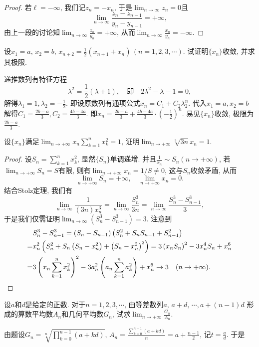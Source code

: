 \begin{quiza}
\begin{proof}
若\(\ell=-\infty\), 我们记\(z_n=-x_n\), 于是\(\lim_{n\rightarrow\infty}z_n=0\)且\[\lim_{n\rightarrow\infty}\frac{z_n-z_{n-1}}{y_n-y_{n-1}}=+\infty,\]由上一段的讨论知\(\lim_{n\rightarrow\infty}\frac{z_n}{y_n}=+\infty\), 从而\(\lim_{n\rightarrow\infty}\frac{x_n}{y_n}=-\infty.\)
\end{proof}
\woe 设\(x_1=a,\,x_2=b,\,x_{n+2}=\frac{1}{2}(x_{n+1}+x_n)\,(n=1,2,3,\cdots)\). 试证明\(\{x_n\}\)收敛, 并求其极限.
\begin{solution}
递推数列有特征方程\[\lambda^2=\frac{1}{2}(\lambda+1),\quad\text{即}\quad 2\lambda^2-\lambda-1=0,\]解得\(\lambda_1=1,\lambda_2=-\frac{1}{2}\). 即设原数列有通项公式\(x_n=C_1+C_2\lambda_2^n\). 代入\(x_1=a,x_2=b\)解得\(C_1=\frac{2b-a}{3},C_2=\frac{4b-4a}{3}.\) 即\(x_n=\frac{2b-a}{3}+\frac{4b-4a}{3}\cdot\left(-\frac{1}{2}\right)^n.\) 易见\(\{x_n\}\)收敛, 极限为\(\frac{2b-a}{3}\).
\end{solution}
\woe 设\(\{x_n\}\)满足\(\lim_{n\rightarrow+\infty}x_{n}\sum_{k=1}^{n}x_k^2=1\), 证明\(\lim_{n\rightarrow+\infty}\sqrt[3]{3n}x_{n}=1\).
\begin{proof}
设\(S_n=\sum_{k=1}^{n}x_k^2\), 显然\(\{S_n\}\)单调递增. 并且\(\frac{1}{x_n}\sim S_n(n\rightarrow+\infty)\), 若\(\lim_{n\rightarrow+\infty}S_n=S\)有限, 则有\(\lim_{n\rightarrow+\infty}x_n=1/S\ne 0\), 这与\(S_n\)收敛矛盾, 从而\[\lim_{n\rightarrow+\infty}S_n=+\infty,\quad\lim_{n\rightarrow+\infty}x_n=0.\]
结合Stolz定理, 我们有\[\lim_{n\rightarrow\infty}\frac{1}{(3n)x_n^3}=\lim_{n\rightarrow\infty}\frac{S_n^3}{3n}=\lim_{n\rightarrow\infty}\frac{S_n^3-S_{n-1}^3}{3},\]于是我们仅需证明\(\lim_{n\rightarrow\infty}\left(S_n^3-S_{n-1}^3\right)=3\). 注意到\[\begin{split}
&S_n^3-S_{n-1}^3=(S_n-S_{n-1})\left(S_n^2+S_nS_{n-1}+S_{n-1}^2\right)\\=&x_n^2\left(S_n^2+S_n\left(S_n-x_n^2\right)+\left(S_n-x_n^2\right)^2\right)=3\left(x_nS_n\right)^2-3x_n^4S_n+x_n^6\\=&3\left(x_n\sum_{k=1}^{n}x_k^2\right)^2-3a_n^2\left(a_n\sum_{k=1}^{n}a_k^2\right)+x_n^6\rightarrow3\quad (n\rightarrow +\infty).\qedhere
\end{split}\]
\end{proof}
\woe 设\(a\)和\(d\)是给定的正数. 对于\(n=1,2,3,\cdots\), 由等差数列\(a,\,a+d,\,\cdots,a+(n-1)d\) 形成的算数平均数\(A_n\)和几何平均数\(G_n\), 试求\(\lim_{n\rightarrow+\infty}\frac{G_n}{A_n}\).
\begin{solution}
由题设\(G_n=\sqrt[n]{\prod_{k=0}^{n-1}\left(a+kd\right)},\,A_n=\frac{\displaystyle\sum_{k=0}^{n-1}\left(a+kd\right)}{n}=a+\frac{n-1}{2}\), 记\(t=\frac{a}{d}\). 于是\[\begin{split}

\end{split}\]
\end{solution}
\end{quiza}
